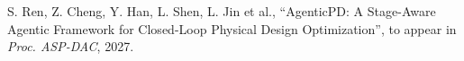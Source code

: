 S. Ren, Z. Cheng, Y. Han, L. Shen, L. Jin et al.,
``AgenticPD: A Stage-Aware Agentic Framework for Closed-Loop Physical Design Optimization'',
to appear in {\em Proc. ASP-DAC}, 2027.
